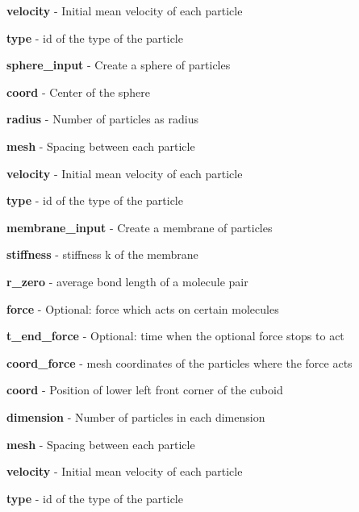 \begin{DoxyItemize}
\begin{DoxyItemize}
\item {\bfseries velocity} -\/ Initial mean velocity of each particle
\item {\bfseries type} -\/ id of the type of the particle
\end{DoxyItemize}
\item {\bfseries sphere\+\_\+input} -\/ Create a sphere of particles
\begin{DoxyItemize}
\item {\bfseries coord} -\/ Center of the sphere
\item {\bfseries radius} -\/ Number of particles as radius
\item {\bfseries mesh} -\/ Spacing between each particle
\item {\bfseries velocity} -\/ Initial mean velocity of each particle
\item {\bfseries type} -\/ id of the type of the particle
\end{DoxyItemize}
\item {\bfseries membrane\+\_\+input} -\/ Create a membrane of particles
\begin{DoxyItemize}
\item {\bfseries stiffness} -\/ stiffness k of the membrane
\item {\bfseries r\+\_\+zero} -\/ average bond length of a molecule pair
\item {\bfseries force} -\/ Optional\+: force which acts on certain molecules
\item {\bfseries t\+\_\+end\+\_\+force} -\/ Optional\+: time when the optional force stops to act
\item {\bfseries coord\+\_\+force} -\/ mesh coordinates of the particles where the force acts
\item {\bfseries coord} -\/ Position of lower left front corner of the cuboid
\item {\bfseries dimension} -\/ Number of particles in each dimension
\item {\bfseries mesh} -\/ Spacing between each particle
\item {\bfseries velocity} -\/ Initial mean velocity of each particle
\item {\bfseries type} -\/ id of the type of the particle
\end{DoxyItemize}
\end{DoxyItemize}

